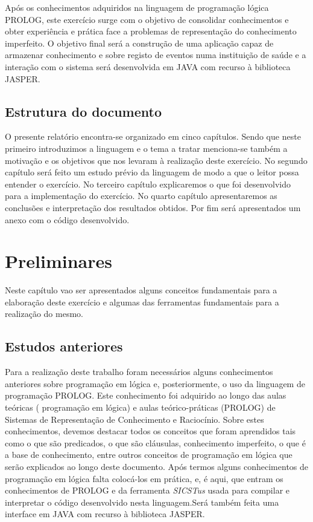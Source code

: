 Após os conhecimentos adquiridos na linguagem de programação lógica PROLOG, este exercício surge com o objetivo de consolidar conhecimentos e obter experiência e prática face a problemas de representação do conhecimento imperfeito. O objetivo final será a construção de uma  aplicação capaz de armazenar conhecimento e sobre registo de eventos numa instituição de saúde e a interação com o sistema será desenvolvida em JAVA com recurso à biblioteca JASPER.



\section{Estrutura do documento}
\label{p1:Estrutura}
O presente relatório encontra-se organizado em cinco capítulos. Sendo que neste primeiro introduzimos a linguagem e o tema a tratar menciona-se também a motivação e os objetivos que nos levaram à realização deste exercício. 
No segundo capítulo será feito um estudo prévio da linguagem de modo a que o leitor possa entender o exercício. No terceiro capítulo explicaremos o que foi desenvolvido para a implementação do exercício. No quarto capítulo apresentaremos as conclusões e interpretação dos resultados obtidos. Por fim será apresentados um anexo com o código desenvolvido. 



\chapter{Preliminares}
\label{cap:p2}
Neste capítulo vao ser apresentados alguns conceitos fundamentais para a elaboração deste exercício e algumas das ferramentas fundamentais para a realização do mesmo.


\section{Estudos anteriores}
\label{p2:estudp}
Para a realização deste trabalho foram necessários alguns conhecimentos anteriores sobre programação em lógica e, posteriormente, o uso da linguagem de programação PROLOG.
Este conhecimento foi adquirido ao longo das aulas teóricas ( programação em lógica) e aulas teórico-práticas (PROLOG) de Sistemas de Representação de Conhecimento e Raciocínio.
Sobre estes conhecimentos, devemos destacar todos os conceitos que foram aprendidos tais como o que são predicados, o que são cláusulas, conhecimento imperfeito, o que é a base de conhecimento, entre outros conceitos de programação em lógica que serão explicados ao longo deste documento.
Após termos alguns conhecimentos de programação em lógica falta colocá-los em prática, e, é aqui, que entram os conhecimentos de PROLOG e da ferramenta \textit{SICSTus} usada para
compilar e interpretar o código desenvolvido nesta linguagem.Será também feita uma interface em JAVA com recurso à biblioteca JASPER. 


